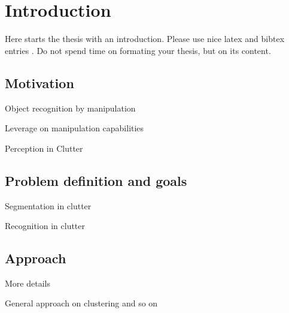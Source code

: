 \chapter{Introduction}
\label{chapter:Introduction}



Here starts the thesis with an introduction. Please use nice latex and bibtex entries \cite{latex}. Do not spend time on formating your thesis, but on its content. 
 
\section{Motivation}
\itemize 
\item Object recognition by manipulation
\item Leverage on manipulation capabilities
\item Perception in Clutter


\section{Problem definition and goals}
\item Segmentation in clutter
\item Recognition in clutter

\section{Approach}
\item More details
\item General approach on clustering and so on	 


